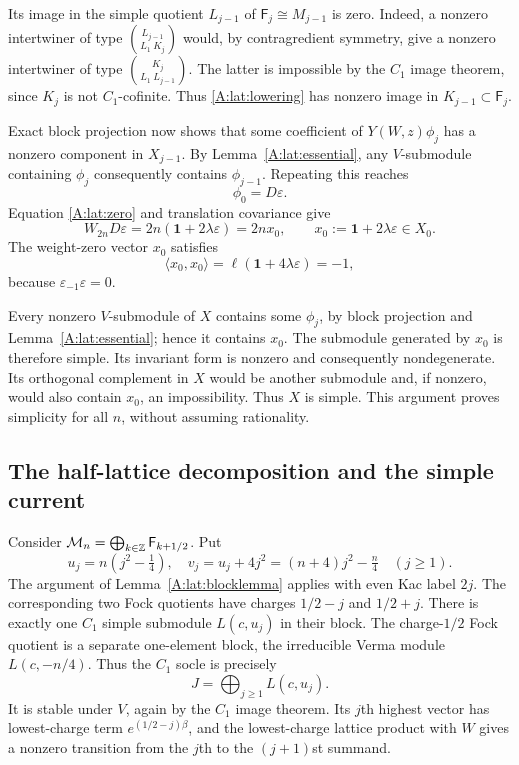 \documentclass[11pt]{article}
\newcommand{\one}{\mathbf1}\newcommand{\D}{\mathcal D}\newcommand{\Dcat}{\mathcal D}
\numberwithin{equation}{section}
\begin{document}
Its image in the simple quotient $L_{j-1}$ of $\mathsf F_j\cong M_{j-1}$ is zero. Indeed, a nonzero intertwiner of type $\binom{L_{j-1}}{L_1\ K_j}$ would, by contragredient symmetry, give a nonzero intertwiner of type $\binom{K_j}{L_1\ L_{j-1}}$. The latter is impossible by the $C_1$ image theorem, since $K_j$ is not $C_1$-cofinite. Thus \eqref{A:lat:lowering} has nonzero image in $K_{j-1}\subset\mathsf F_j$.

Exact block projection now shows that some coefficient of $Y(W,z)\phi_j$ has a nonzero component in $X_{j-1}$. By Lemma~\ref{A:lat:essential}, any $V$-submodule containing $\phi_j$ consequently contains $\phi_{j-1}$. Repeating this reaches
\[
 \phi_0=D\varepsilon.
\]
Equation \eqref{A:lat:zero} and translation covariance give
\begin{equation}\label{A:lat:x0}
 W_{2n}D\varepsilon=2n(\one+2\lambda\varepsilon)=2n x_0,
 \qquad x_0:=\one+2\lambda\varepsilon\in X_0.
\end{equation}
The weight-zero vector $x_0$ satisfies
\[
 \langle x_0,x_0\rangle
 =\ell(\one+4\lambda\varepsilon)=-1,
\]
because $\varepsilon_{-1}\varepsilon=0$.

Every nonzero $V$-submodule of $X$ contains some $\phi_j$, by block projection and Lemma~\ref{A:lat:essential}; hence it contains $x_0$. The submodule generated by $x_0$ is therefore simple. Its invariant form is nonzero and consequently nondegenerate. Its orthogonal complement in $X$ would be another submodule and, if nonzero, would also contain $x_0$, an impossibility. Thus $X$ is simple. This argument proves simplicity for all $n$, without assuming rationality.

\subsection{The half-lattice decomposition and the simple current}
Consider $\mathcal M_n=\bigoplus_{k\in\mathbb Z}\mathsf F_{k+1/2}$. Put
\[
 u_j=n(j^2-\tfrac14),\quad v_j=u_j+4j^2=(n+4)j^2-\tfrac n4
 \quad(j\geq1).
\]
The argument of Lemma~\ref{A:lat:blocklemma} applies with even Kac label $2j$. The corresponding two Fock quotients have charges $1/2-j$ and $1/2+j$. There is exactly one $C_1$ simple submodule $L(c,u_j)$ in their block. The charge-$1/2$ Fock quotient is a separate one-element block, the irreducible Verma module $L(c,-n/4)$. Thus the $C_1$ socle is precisely
\[
 J=\bigoplus_{j\geq1}L(c,u_j).
\]
It is stable under $V$, again by the $C_1$ image theorem. Its $j$th highest vector has lowest-charge term $e^{(1/2-j)\beta}$, and the lowest-charge lattice product with $W$ gives a nonzero transition from the $j$th to the $(j+1)$st summand.
\end{document}
